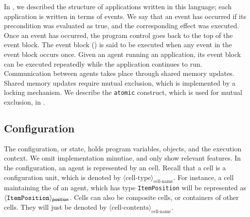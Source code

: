  
 


In , we described the structure of applications written in this language; each application is written in terms of events. We say that an event has occurred if its precondition was evaluated as true, and the corresponding effect was executed. Once an event has occurred, the program control goes back to the top of the event block. The event block () is said to be executed when any event in the event block occurs once. Given an agent running an application, its event block can be executed repeatedly while the application continues to run. Communication between agents takes place through shared memory updates. Shared memory updates require mutual exclusion, which is implemented by a locking mechanism. We describe the \verb|atomic| construct, which is used for mutual exclusion, in .


\subsection[h]{Configuration}
The configuration, or state, holds program variables, objects, and the execution context. We omit implementation minutiae, and only show relevant features. In the configuration, an agent is represented by an  cell. Recall that a cell is a configuration unit, which is denoted by $\langle \mbox{cell-type} \rangle_{\mbox{cell-name}}$. For instance, a cell maintaining the  of an agent, which has type \verb|ItemPosition| will be represented as $\langle {\verb|ItemPosition|} \rangle_{\s{position}}$. Cells can also be composite cells, or containers of other cells. They will just be denoted by $\langle\mbox{cell-contents}\rangle_{\mbox{cell-name}}$.  

